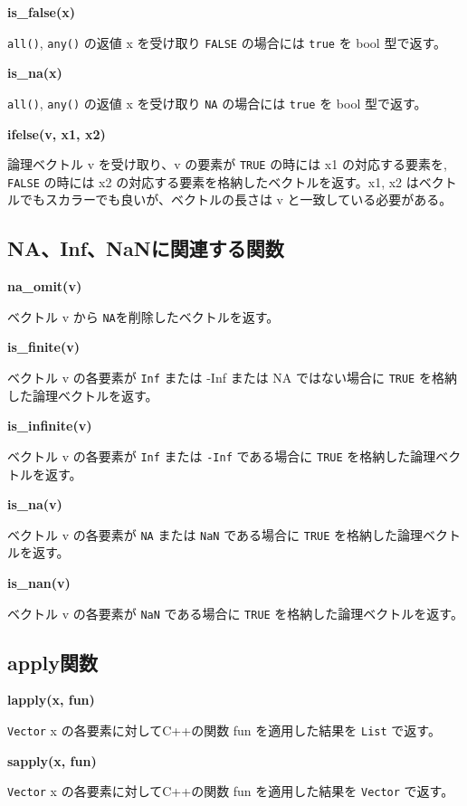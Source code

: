 \documentclass[]{book}
\begin{document}
\textbf{is\_false(x)}

\texttt{all()}, \texttt{any()} の返値 x を受け取り \texttt{FALSE} の場合には \texttt{true} を bool 型で返す。

\textbf{is\_na(x)}

\texttt{all()}, \texttt{any()} の返値 x を受け取り \texttt{NA} の場合には \texttt{true} を bool 型で返す。

\textbf{ifelse(v, x1, x2)}

論理ベクトル v を受け取り、v の要素が \texttt{TRUE} の時には x1 の対応する要素を, \texttt{FALSE} の時には x2 の対応する要素を格納したベクトルを返す。x1, x2 はベクトルでもスカラーでも良いが、ベクトルの長さは v と一致している必要がある。

\hypertarget{nainfnan}{%
\subsection{NA、Inf、NaNに関連する関数}\label{nainfnan}}

\textbf{na\_omit(v)}

ベクトル v から \texttt{NA}を削除したベクトルを返す。

\textbf{is\_finite(v)}

ベクトル v の各要素が \texttt{Inf} または -Inf または NA ではない場合に \texttt{TRUE} を格納した論理ベクトルを返す。

\textbf{is\_infinite(v)}

ベクトル v の各要素が \texttt{Inf} または \texttt{-Inf} である場合に \texttt{TRUE} を格納した論理ベクトルを返す。

\textbf{is\_na(v)}

ベクトル v の各要素が \texttt{NA} または \texttt{NaN} である場合に \texttt{TRUE} を格納した論理ベクトルを返す。

\textbf{is\_nan(v)}

ベクトル v の各要素が \texttt{NaN} である場合に \texttt{TRUE} を格納した論理ベクトルを返す。

\hypertarget{apply}{%
\subsection{apply関数}\label{apply}}

\textbf{lapply(x, fun)}

\texttt{Vector} x の各要素に対してC++の関数 fun を適用した結果を \texttt{List} で返す。

\textbf{sapply(x, fun)}

\texttt{Vector} x の各要素に対してC++の関数 fun を適用した結果を \texttt{Vector} で返す。
\end{document}
